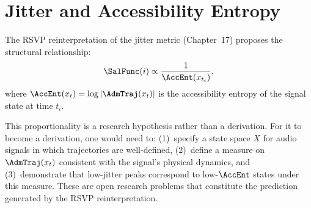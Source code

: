 \section{Jitter and Accessibility Entropy}
\label{app-b:jitter-entropy}

The RSVP reinterpretation of the jitter metric
(Chapter~17) proposes the structural relationship:
\[
  \SalFunc(i) \propto \frac{1}{\AccEnt(x_{t_i})},
\]
where $\AccEnt(x_t) = \log|\AdmTraj(x_t)|$ is the
accessibility entropy of the signal state at time $t_i$.

This proportionality is a research hypothesis rather
than a derivation. For it to become a derivation,
one would need to: (1)~specify a state space $X$
for audio signals in which trajectories are well-defined,
(2)~define a measure on $\AdmTraj(x_t)$ consistent
with the signal's physical dynamics, and (3)~demonstrate
that low-jitter peaks correspond to low-$\AccEnt$
states under this measure. These are open research
problems that constitute the \LevelI{} prediction
generated by the RSVP reinterpretation.
